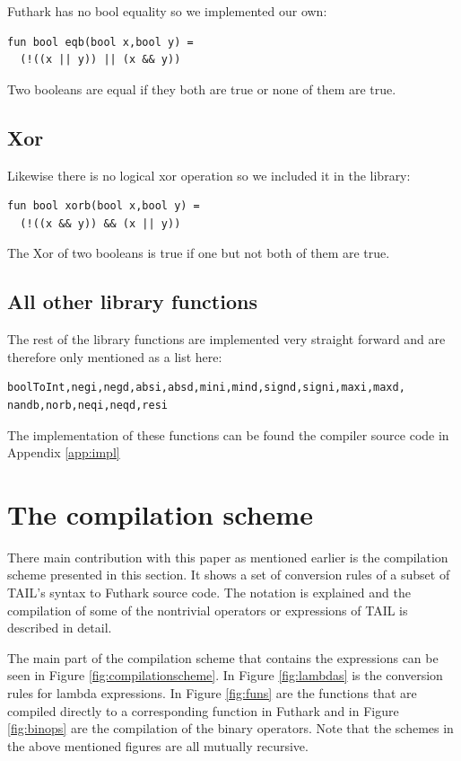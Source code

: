 \documentclass[11pt]{article}
\begin{document}
Futhark has no bool equality so we implemented our own:

\begin{lstlisting}[language=Futhark]
fun bool eqb(bool x,bool y) =
  (!((x || y)) || (x && y))
\end{lstlisting}

Two booleans are equal if they both are true or none of them are true.

\subsection{Xor} Likewise there is no logical xor operation so we included it in the library:

\begin{lstlisting}[language=Futhark]
fun bool xorb(bool x,bool y) =
  (!((x && y)) && (x || y))
\end{lstlisting}

The Xor of two booleans is true if one but not both of them are true.

\subsection{All other library functions}
The rest of the library functions are implemented very straight forward and are therefore only mentioned as a list here:

\begin{lstlisting}[numbers=none,frame=none]
boolToInt,negi,negd,absi,absd,mini,mind,signd,signi,maxi,maxd,
nandb,norb,neqi,neqd,resi
\end{lstlisting}
The implementation of these functions can be found the compiler source code in Appendix \ref{app:impl}

\section{The compilation scheme}
\label{sec:scheme}

There main contribution with this paper as mentioned earlier is the compilation scheme presented in this section.
It shows a set of conversion rules of a subset of TAIL's syntax to Futhark source code.
The notation is explained and the compilation of some of the nontrivial operators or expressions of TAIL is described in detail. 

The main part of the compilation scheme that contains the expressions can be seen in Figure
\ref{fig:compilationscheme}.
In Figure \ref{fig:lambdas} is the conversion rules for lambda expressions.
In Figure \ref{fig:funs} are the functions that are compiled directly to a corresponding function in Futhark and in Figure \ref{fig:binops} are the compilation of the binary operators. Note that the schemes in the above mentioned figures are all mutually recursive. 
\end{document}
